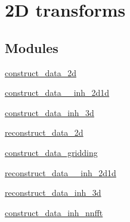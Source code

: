 \hypertarget{group__applications__mri2d}{
\section{2D transforms}
\label{group__applications__mri2d}
}
\subsection*{Modules}
\begin{CompactItemize}
\item 
\hyperlink{group__applications__mri2d__construct__data__2d}{construct\_\-data\_\-2d}
\item 
\hyperlink{group__applications__mri2d__construct__data__inh__2d1d}{construct\_\-data\_\-\_\-inh\_\-2d1d}
\item 
\hyperlink{group__applications__mri2d__construct__data__inh__3d}{construct\_\-data\_\-inh\_\-3d}
\item 
\hyperlink{group__applications__mri2d__reconstruct__data__2d}{reconstruct\_\-data\_\-2d}
\item 
\hyperlink{group__applications__mri2d__construct__data__gridding}{construct\_\-data\_\-gridding}
\item 
\hyperlink{group__applications__mri2d__reconstruct__data__inh__2d1d}{reconstruct\_\-data\_\-\_\-inh\_\-2d1d}
\item 
\hyperlink{group__applications__mri2d__reconstruct__data__inh__3d}{reconstruct\_\-data\_\-inh\_\-3d}
\item 
\hyperlink{group__applications__mri2d__construct__data__inh__nnfft}{construct\_\-data\_\-inh\_\-nnfft}
\end{CompactItemize}
